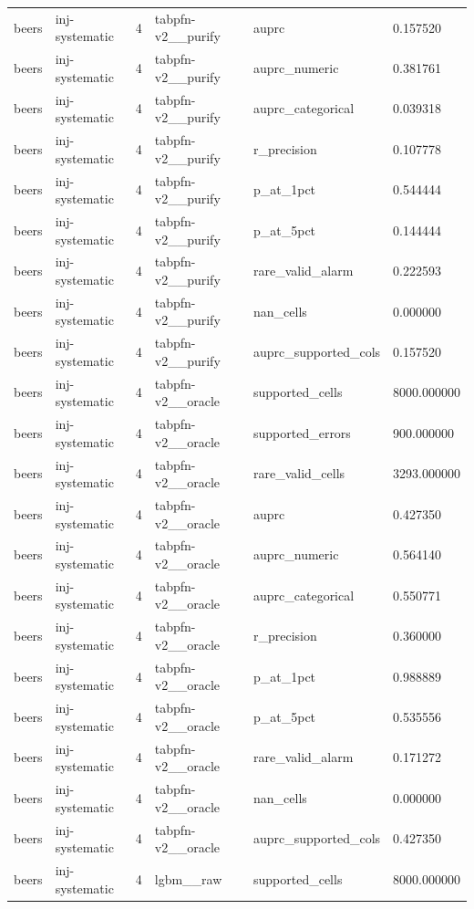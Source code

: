 \begin{tabular}{llllll}
beers & inj-systematic & 4 & tabpfn-v2\_\_purify & auprc & 0.157520 \\
beers & inj-systematic & 4 & tabpfn-v2\_\_purify & auprc\_numeric & 0.381761 \\
beers & inj-systematic & 4 & tabpfn-v2\_\_purify & auprc\_categorical & 0.039318 \\
beers & inj-systematic & 4 & tabpfn-v2\_\_purify & r\_precision & 0.107778 \\
beers & inj-systematic & 4 & tabpfn-v2\_\_purify & p\_at\_1pct & 0.544444 \\
beers & inj-systematic & 4 & tabpfn-v2\_\_purify & p\_at\_5pct & 0.144444 \\
beers & inj-systematic & 4 & tabpfn-v2\_\_purify & rare\_valid\_alarm & 0.222593 \\
beers & inj-systematic & 4 & tabpfn-v2\_\_purify & nan\_cells & 0.000000 \\
beers & inj-systematic & 4 & tabpfn-v2\_\_purify & auprc\_supported\_cols & 0.157520 \\
beers & inj-systematic & 4 & tabpfn-v2\_\_oracle & supported\_cells & 8000.000000 \\
beers & inj-systematic & 4 & tabpfn-v2\_\_oracle & supported\_errors & 900.000000 \\
beers & inj-systematic & 4 & tabpfn-v2\_\_oracle & rare\_valid\_cells & 3293.000000 \\
beers & inj-systematic & 4 & tabpfn-v2\_\_oracle & auprc & 0.427350 \\
beers & inj-systematic & 4 & tabpfn-v2\_\_oracle & auprc\_numeric & 0.564140 \\
beers & inj-systematic & 4 & tabpfn-v2\_\_oracle & auprc\_categorical & 0.550771 \\
beers & inj-systematic & 4 & tabpfn-v2\_\_oracle & r\_precision & 0.360000 \\
beers & inj-systematic & 4 & tabpfn-v2\_\_oracle & p\_at\_1pct & 0.988889 \\
beers & inj-systematic & 4 & tabpfn-v2\_\_oracle & p\_at\_5pct & 0.535556 \\
beers & inj-systematic & 4 & tabpfn-v2\_\_oracle & rare\_valid\_alarm & 0.171272 \\
beers & inj-systematic & 4 & tabpfn-v2\_\_oracle & nan\_cells & 0.000000 \\
beers & inj-systematic & 4 & tabpfn-v2\_\_oracle & auprc\_supported\_cols & 0.427350 \\
beers & inj-systematic & 4 & lgbm\_\_raw & supported\_cells & 8000.000000 \\

\end{tabular}
